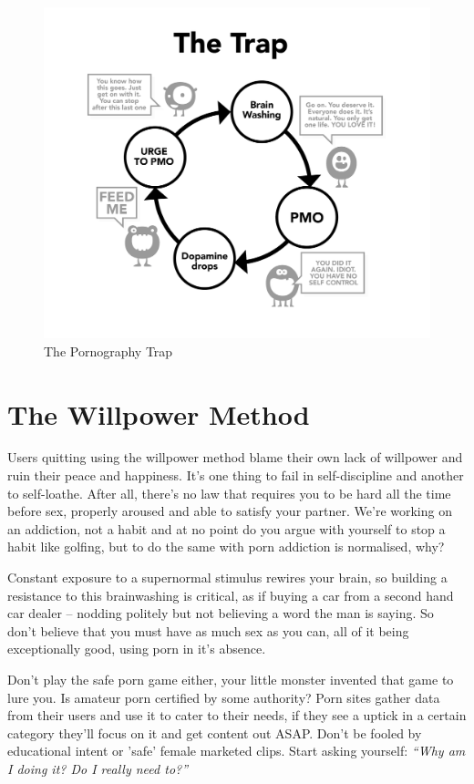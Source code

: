 \documentclass[
]{book}
\begin{document}
\begin{figure}
\centering
\includegraphics{images/trap.png}
\caption{The Pornography Trap}
\end{figure}

\hypertarget{the-willpower-method}{%
\section{The Willpower Method}\label{the-willpower-method}}

Users quitting using the willpower method blame their own lack of willpower and ruin their peace and happiness. It's one thing to fail in self-discipline and another to self-loathe. After all, there's no law that requires you to be hard all the time before sex, properly aroused and able to satisfy your partner. We're working on an addiction, not a habit and at no point do you argue with yourself to stop a habit like golfing, but to do the same with porn addiction is normalised, why?

Constant exposure to a supernormal stimulus rewires your brain, so building a resistance to this brainwashing is critical, as if buying a car from a second hand car dealer -- nodding politely but not believing a word the man is saying. So don't believe that you must have as much sex as you can, all of it being exceptionally good, using porn in it's absence.

Don't play the safe porn game either, your little monster invented that game to lure you. Is amateur porn certified by some authority? Porn sites gather data from their users and use it to cater to their needs, if they see a uptick in a certain category they'll focus on it and get content out ASAP. Don't be fooled by educational intent or 'safe' female marketed clips. Start asking yourself: \emph{``Why am I doing it? Do I really need to?''}
\end{document}
